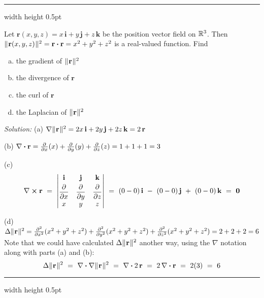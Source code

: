 \vspace{3mm}
\hrule width \textwidth height 0.5pt
\begin{exmp}\label{exmp:laplposition}
 Let $\textbf{r}(x,y,z) = x\,\textbf{i} + y\,\textbf{j} + z\,\textbf{k}$ be the position vector field on
 $\mathbb{R}^{3}$. Then $\lVert\mspace{1mu}\textbf{r}(x,y,z)\mspace{1mu}\rVert^2 = \textbf{r} \bm{\cdot} \textbf{r} = x^2 + y^2 + z^2$ is a real-valued
 function. Find
 \begin{enumerate}[(a)]
  \item the gradient of $\lVert\mspace{1mu}\textbf{r}\mspace{1mu}\rVert^2$
  \item the divergence of $\textbf{r}$
  \item the curl of $\textbf{r}$
  \item the Laplacian of $\lVert\mspace{1mu}\textbf{r}\mspace{1mu}\rVert^2$
 \end{enumerate}
\newpage
 \par\noindent \emph{Solution:} (a) $\nabla \lVert\mspace{1mu}\textbf{r}\mspace{1mu}\rVert^2 = 2x\,\textbf{i} + 2y\,\textbf{j} + 2z\,\textbf{k}
  = 2\,\textbf{r}$\vspace{2mm}
 \par\noindent (b) $\nabla \bm{\cdot} \textbf{r} = \frac{\partial}{\partial x}(x) + \frac{\partial}{\partial y}(y) +
  \frac{\partial}{\partial z}(z) = 1+1+1=3$\vspace{2mm}
 \par\noindent (c)
 \begin{displaymath}
  \Crossprod{\nabla}{\textbf{r}} ~=~ \begin{vmatrix}
  \textbf{i} & \textbf{j} & \textbf{k} \vspace{1mm}\\ \dfrac{\partial}{\partial x} & \dfrac{\partial}{\partial y} &
   \dfrac{\partial}{\partial z} \\
  x & y & z
 \end{vmatrix} ~=~ (0-0)\,\textbf{i} ~-~ (0-0)\,\textbf{j} ~+~ (0-0)\,\textbf{k} ~=~ \textbf{0}
 \end{displaymath}
 \par\noindent (d) $\Delta \lVert\mspace{1mu}\textbf{r}\mspace{1mu}\rVert^2 = \frac{\partial^2}{\partial x^2}(x^2 + y^2 + z^2 ) +
  \frac{\partial^2}{\partial y^2}(x^2 + y^2 + z^2 ) + \frac{\partial^2}{\partial z^2}(x^2 + y^2 + z^2 ) =
  2+2+2=6$\vspace{2mm}\\
  Note that we could have calculated $\Delta \lVert\mspace{1mu}\textbf{r}\mspace{1mu}\rVert^2$ another way, using the $\nabla$ notation along with
  parts (a) and (b):
  \begin{displaymath}
   \Delta \lVert\mspace{1mu}\textbf{r}\mspace{1mu}\rVert^2 ~=~ \nabla \bm{\cdot} \nabla \lVert\mspace{1mu}\textbf{r}\mspace{1mu}\rVert^2 ~=~ \nabla \bm{\cdot} 2\,\textbf{r} ~=~
   2\,\nabla \bm{\cdot} \textbf{r} ~=~ 2(3) ~=~ 6
  \end{displaymath}
\end{exmp}
\hrule width \textwidth height 0.5pt
\vspace{3mm}

